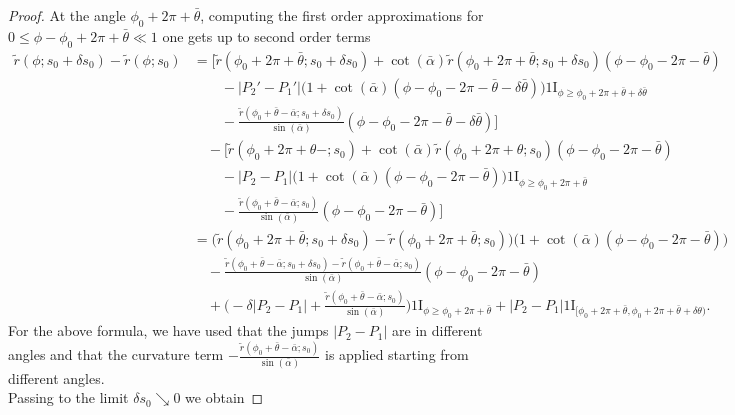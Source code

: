 \documentclass[reqno]{amsart}
\theoremstyle{definition} \newtheorem{definition}{Definition}[section]
\theoremstyle{definition} \newtheorem{remark}[definition]{Remark}
\theoremstyle{plain} \newtheorem{lemma}[definition]{Lemma}
\theoremstyle{plain} \newtheorem{proposition}[definition]{Proposition}
\theoremstyle{plain} \newtheorem{theorem}[definition]{Theorem}
\theoremstyle{plain} \newtheorem{corollary}[definition]{Corollary}
\theoremstyle{definition} \newtheorem{example}[definition]{Example}
\theoremstyle{plain} \newtheorem{claim}[clai]{Claim}
\theoremstyle{definition} \newtheorem{assumption}[definition]{Assumption}
\theoremstyle{definition} \newtheorem{observation}[definition]{Observation}
\newcommand{\ind}{1\!\!\mathrm{I}}
\newcommand{\1}{\mathbbm 1}
\numberwithin{equation}{section} %
\theoremstyle{plain} \newtheorem*{theorem*}{Theorem}
\theoremstyle{plain} \newtheorem{mthm}[maintheorem]{Main Theorem}
\theoremstyle{plain} \newtheorem*{mthm*}{Main Theorem}
\theoremstyle{plain} \newtheorem*{conjecture*}{Conjecture}
\theoremstyle{plain} \newtheorem{conjecture}[definition]{Conjecture}
\theoremstyle{plain} \newtheorem*{problem*}{Problem}
\begin{document}
\begin{proof}
At the angle $\phi_0 + 2\pi + \bar \theta$, computing the first order approximations for $0 \leq \phi - \phi_0 + 2\pi + \bar \theta \ll 1$ one gets up to second order terms
\begin{align*}
\tilde r(\phi;s_0 + \delta s_0) - \tilde r(\phi;s_0) &= \bigg[ \tilde r(\phi_0 + 2\pi + \bar\theta; s_0 + \delta s_0) + \cot(\bar \alpha) \tilde r(\phi_0 + 2\pi + \bar\theta;s_0 + \delta s_0) (\phi - \phi_0 - 2\pi - \bar \theta) \\
& \quad \quad - |P_2' - P_1'| \big( 1 + \cot(\bar \alpha) (\phi - \phi_0 - 2\pi - \bar \theta - \delta \bar \theta) \big) \ind_{\phi \geq \phi_0 + 2\pi + \bar \theta + \delta \bar \theta} \\
& \quad \quad - \frac{\tilde r(\phi_0 + \bar \theta - \bar \alpha;s_0 + \delta s_0)}{\sin(\bar \alpha)} (\phi - \phi_0 - 2\pi - \bar \theta - \delta \bar \theta) \bigg] \\
& \quad - \bigg[ \tilde r(\phi_0 + 2\pi + \theta-;s_0) + \cot(\bar \alpha) \tilde r(\phi_0 + 2\pi +\theta;s_0) (\phi - \phi_0 - 2\pi - \bar \theta) \\
& \quad \quad - |P_2 - P_1| \big( 1 + \cot(\bar \alpha) (\phi - \phi_0 - 2\pi - \bar \theta) \big) \ind_{\phi \geq \phi_0 + 2\pi + \bar \theta}  \\
& \quad \quad - \frac{\tilde r(\phi_0 + \bar \theta - \bar \alpha;s_0)}{\sin(\bar \alpha)} (\phi - \phi_0 - 2\pi - \bar \theta) \bigg] \\
&= \big( \tilde r(\phi_0 + 2\pi + \bar\theta;s_0 + \delta s_0) - \tilde r(\phi_0 + 2\pi + \bar\theta;s_0) \big) \big( 1 + \cot(\bar \alpha) (\phi - \phi_0 - 2\pi - \bar \theta) \big) \\
& \quad - \frac{\tilde r(\phi_0 + \bar \theta - \bar \alpha;s_0 + \delta s_0) - \tilde r(\phi_0 + \bar \theta - \bar \alpha;s_0)}{\sin(\bar \alpha)} (\phi - \phi_0 - 2\pi - \bar \theta) \\
& \quad + \bigg( - \delta |P_2 - P_1| + \frac{\tilde r(\phi_0 + \bar \theta - \bar \alpha;s_0)}{\sin(\bar \alpha)} \bigg) \ind_{\phi \geq \phi_0 + 2\pi + \bar \theta} + |P_2 - P_1| \ind_{[\phi_0 + 2\pi + \bar \theta,\phi_0 + 2\pi + \bar \theta + \delta \theta)}.
\end{align*}
For the above formula, we have used that the jumps $|P_2 - P_1|$ are in different angles and that the curvature term $- \frac{\tilde r(\phi_0+\bar \theta -\bar \alpha;s_0)}{\sin(\bar \alpha)}$ is applied starting from different angles. \\
Passing to the limit $\delta s_0 \searrow 0$ we obtain

\end{proof}
\end{document}
